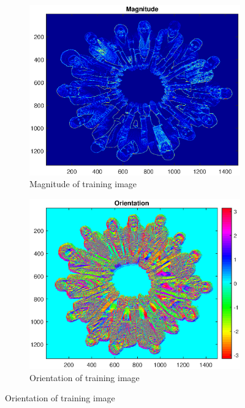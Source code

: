 \documentclass{article}
\newcommand{\tl}[1]{\textlatin{#1}}
\begin{document}
\begin{figure}[H]
		\begin{subfigure}[b]{0.5\textwidth}
			\includegraphics[width=\textwidth]{res/mag.eps}
			\caption{\tl{Magnitude of training image}}
		\end{subfigure}%
		\begin{subfigure}[b]{0.5\textwidth}
			\includegraphics[width=\textwidth]{res/ori.eps}
			\caption{\tl{Orientation of training image}}
		\end{subfigure}%
		

\end{figure}
\end{document}
